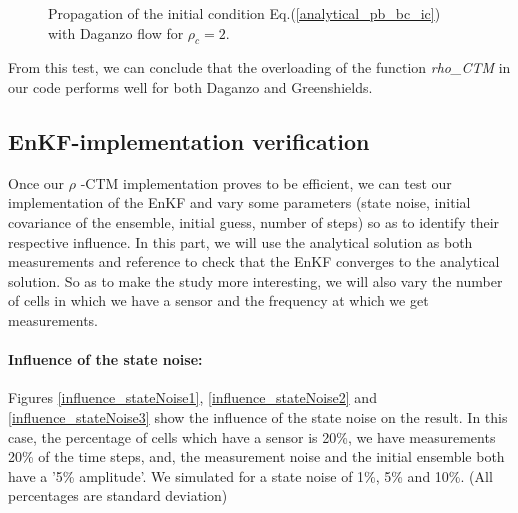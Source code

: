 \documentclass[letterpaper,10pt]{article}
\begin{document}
\begin{figure}
  \centering
  \caption{Propagation of the initial condition  Eq.(\ref{analytical_pb_bc_ic}) with Daganzo flow for $\rho_c=2$.}\label{Daganzo_test2}
\end{figure}

From this test, we can conclude that the overloading of the function \textit{rho\_CTM} in our code performs well for both Daganzo and Greenshields.

\subsection{EnKF-implementation verification}
Once our $\rho$ -CTM implementation proves to be efficient, we can test our implementation of the EnKF and vary some parameters (state noise, initial covariance of the ensemble, initial guess, number of steps) so as to identify their respective influence. In this part, we will use the analytical solution as both measurements and reference to check that the EnKF converges to the analytical solution. So as to make the study more interesting, we will also vary the number of cells in which we have a sensor and the frequency at which we get measurements. 

\bigskip
\paragraph{Influence of the state noise: }
Figures \ref{influence_stateNoise1}, \ref{influence_stateNoise2} and \ref{influence_stateNoise3} show the influence of the state noise on the result. In this case, the percentage of cells which have a sensor is 20\%, we have measurements 20\% of the time steps, and, the measurement noise and the initial ensemble both have a '5\% amplitude'. We simulated for a state noise of 1\%, 5\% and 10\%. (All percentages are standard deviation)
\end{document}

